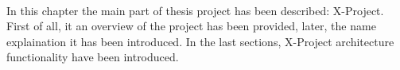 \paragraph{}
In this chapter the main part of thesis project has been described: X-Project.
First of all, it an overview of the project has been provided, later, the name explaination it has been introduced. In the last sections, X-Project architecture functionality have been introduced.

